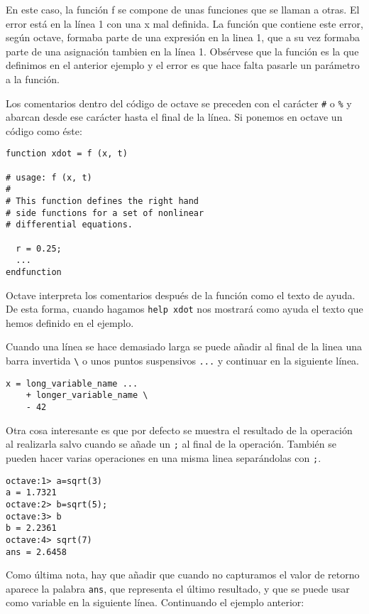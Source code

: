 En este caso, la función f se  compone de unas funciones que se llaman
a  otras. El  error está  en la  línea 1  con una  x mal  definida. La
función que  contiene este error,  según octave, formaba parte  de una
expresión en la linea 1, que a  su vez formaba parte de una asignación
tambien en la línea 1. Obsérvese que la función es la que definimos en
el anterior ejemplo y el error  es que hace falta pasarle un parámetro
a la función.

Los  comentarios  dentro del  código  de  octave  se preceden  con  el
carácter \verb|#|  o \verb|%|  y abarcan desde  ese carácter  hasta el
final de la línea. Si ponemos en octave un código como éste:

\begin{verbatim}
function xdot = f (x, t)

# usage: f (x, t)
#
# This function defines the right hand
# side functions for a set of nonlinear
# differential equations.

  r = 0.25;
  ...
endfunction
\end{verbatim}

Octave interpreta los comentarios después  de la función como el texto
de ayuda. De  esta forma, cuando hagamos {\tt help  xdot} nos mostrará
como ayuda el texto que hemos definido en el ejemplo.

Cuando una línea  se hace demasiado larga se puede  añadir al final de
la  linea  una barra  invertida  \verb|\|  o unos  puntos  suspensivos
\verb|...| y continuar en la siguiente línea.

\begin{verbatim}
x = long_variable_name ...
    + longer_variable_name \
    - 42
\end{verbatim}

Otra cosa interesante es que por defecto se muestra el resultado de la
operación al realizarla salvo cuando se  añade un \verb|;| al final de
la operación. También se pueden  hacer varias operaciones en una misma
linea separándolas con \verb|;|.

\begin{verbatim}
octave:1> a=sqrt(3)
a = 1.7321
octave:2> b=sqrt(5);
octave:3> b
b = 2.2361
octave:4> sqrt(7)
ans = 2.6458
\end{verbatim}

Como última nota, hay que añadir  que cuando no capturamos el valor de
retorno  aparece  la  palabra  {\tt ans},  que  representa  el  último
resultado, y  que se puede usar  como variable en la  siguiente línea.
Continuando el ejemplo anterior:


